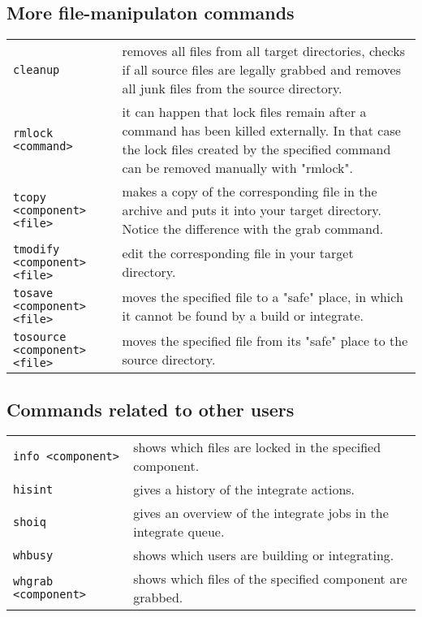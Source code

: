 \subsection{More file-manipulaton commands}
\begin{tabular}{l p{7.7cm}}
\verb+cleanup+                         & removes all files from all target directories,
                                  checks if all source files are legally grabbed
                                  and removes all junk files from the source
                                  directory.    \\
\verb+rmlock <command>+                & it can happen that lock files remain after
                                  a command has been killed externally. In that
                                  case the lock files created by the specified
                                command can be removed manually with "rmlock".\\
\verb+tcopy <component> <file>+ & makes a copy of the corresponding file in the
                                  archive and puts it into your target
                                  directory. Notice the difference with the
                                  grab command.\\
\verb+tmodify <component> <file>+ & edit the corresponding file in your target
                                  directory.\\
\verb+tosave <component> <file>+ & moves the specified file to a "safe" place, in
                                  which it cannot be found by a build or 
                                  integrate.  \\
\verb+tosource <component> <file>+ & 
                                 moves the specified file from its "safe" place
                                  to the source directory.\\
\end{tabular}
\subsection{Commands related to other users}
\begin{tabular}{l p{7.7cm}}
\verb+info <component>+            & shows which files are locked in the specified
                                  component.\\
\verb+hisint+                          & gives a history of the integrate actions.\\
\verb+shoiq+                           & gives an overview of the integrate jobs in
                                  the integrate queue.\\
\verb+whbusy+                       & shows which users are building or integrating.\\
\verb+whgrab <component>+       & shows which files of the specified component
                                  are grabbed.\\
\end{tabular}
